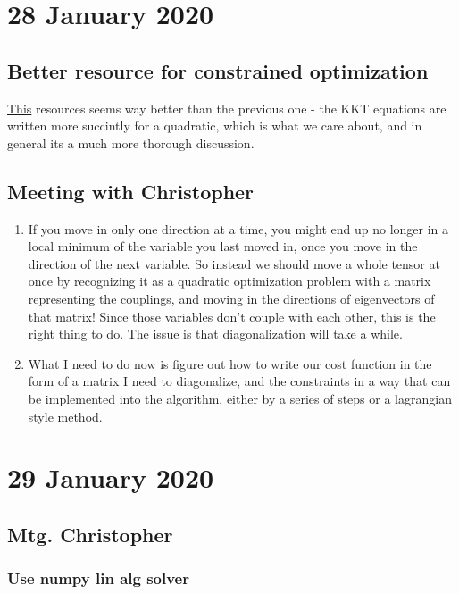 \documentclass{report}
\begin{document}
\chapter{28 January 2020}

\section{Better resource for constrained optimization}

\href{http://people.duke.edu/~hpgavin/cee201/LagrangeMultipliers.pdf}{This} resources seems way better than the previous one - the KKT equations are written more succintly for a quadratic, which is what we care about, and in general its a much more thorough discussion.

\section{Meeting with Christopher}

\begin{enumerate}
\item If you move in only one direction at a time, you might end up no longer in a local minimum of the variable you last moved in, once you move in the direction of the next variable. So instead we should move a whole tensor at once by recognizing it as a quadratic optimization problem with a matrix representing the couplings, and moving in the directions of eigenvectors of that matrix! Since those variables don't couple with each other, this is the right thing to do. The issue is that diagonalization will take a while.
\item What I need to do now is figure out how to write our cost function in the form of a matrix I need to diagonalize, and the constraints in a way that can be implemented into the algorithm, either by a series of steps or a lagrangian style method. 
\end{enumerate}

\chapter{29 January 2020}

\section{Mtg. Christopher}

\subsection{Use numpy lin alg solver}
\end{document}
